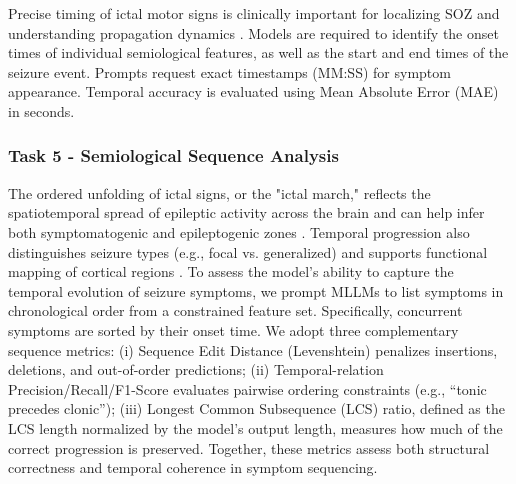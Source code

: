 \documentclass{article}
\theoremstyle{plain}
\theoremstyle{definition}
\theoremstyle{remark}
\begin{document}
Precise timing of ictal motor signs is clinically important for localizing SOZ and understanding propagation dynamics \cite{Blair2012TemporalLobeEpilepsySemiology, Jaafar2024GTC, blume2001glossary}. Models are required to identify the onset times of individual semiological features, as well as the start and end times of the seizure event. Prompts request exact timestamps (MM:SS) for symptom appearance. Temporal accuracy is evaluated using Mean Absolute Error (MAE) in seconds.

\subsubsection{Task 5 - Semiological Sequence Analysis}
\label{subsubsec:tasks5_metrics}

The ordered unfolding of ictal signs, or the "ictal march," reflects the spatiotemporal spread of epileptic activity across the brain and can help infer both symptomatogenic and epileptogenic zones \cite{blume2001glossary, jobst2013seizure}. Temporal progression also distinguishes seizure types (e.g., focal vs. generalized) and supports functional mapping of cortical regions \cite{jobst2013seizure}. To assess the model’s ability to capture the temporal evolution of seizure symptoms, we prompt MLLMs to list symptoms in chronological order from a constrained feature set. Specifically, concurrent symptoms are sorted by their onset time. We adopt three complementary sequence metrics: (i) Sequence Edit Distance (Levenshtein) penalizes insertions, deletions, and out-of-order predictions; (ii) Temporal-relation Precision/Recall/F1-Score evaluates pairwise ordering constraints (e.g., “tonic precedes clonic”); (iii) Longest Common Subsequence (LCS) ratio, defined as the LCS length normalized by the model’s output length, measures how much of the correct progression is preserved. Together, these metrics assess both structural correctness and temporal coherence in symptom sequencing.
\end{document}
